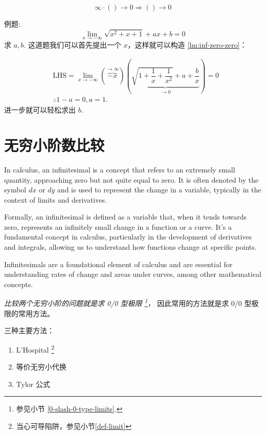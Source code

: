 \begin{lemma} \label{lm:inf-zero-zero}
	\begin{equation}
		\infty \cdot () \to 0 \Rightarrow () \to 0
	\end{equation}

\end{lemma}

例题:
\[
\lim_{x \to -\infty} \sqrt{x^2+x+1} +  ax + b = 0
\]
求 $a, b.$
这道题我们可以首先提出一个 $x$，这样就可以构造 \ref{lm:inf-zero-zero}：

\begin{align*}
	&\mbox{LHS} = \lim_{x \to -\infty} \left(\overbrace{-x}^{ \to \infty }\right)
	\left( 
	\underbrace{\sqrt{1+\dfrac{1}{x}+\dfrac{1}{x^2}} + a + \dfrac{b}{x}}_{\to 0}
	\right) = 0\\
	&\therefore 1-a = 0, a = 1.
\end{align*}
进一步就可以轻松求出 $b$.

\section{无穷小阶数比较}

\begin{definition}
    In calculus, an infinitesimal is a concept that refers 
    to an extremely small quantity, approaching zero 
    but not quite equal to zero. It is often denoted 
    by the symbol $dx$ or $dy$ and is used to represent 
    the change in a variable, typically in the context of 
    limits and derivatives.

    Formally, an infinitesimal is defined as a variable that, 
    when it tends towards zero, represents an infinitely 
    small change in a function or a curve. 
    It's a fundamental concept in calculus, 
    particularly in the development of derivatives and integrals, 
    allowing us to understand how functions change at specific points.

    Infinitesimals are a foundational element of calculus and 
    are essential for understanding rates of 
    change and areas under curves, among other mathematical concepts.
\end{definition}

\emph{比较两个无穷小阶的问题就是求 0/0 型极限
    \footnote{参见小节 \ref{0-slash-0-type-limits}.}，
}
因此常用的方法就是求 0/0 型极限的常用方法。

三种主要方法：
\begin{enumerate}
    \item L'Hospital \footnote{当心可导陷阱，参见小节\ref{def-limit}}
	\item 等价无穷小代换
	\item Tylor 公式
\end{enumerate}

